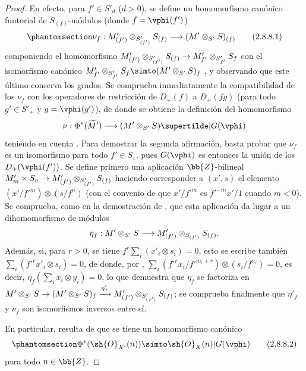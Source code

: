 \documentclass[oneside,10pt]{amsart}
\makeatletter
\newcommand{\ega@arrow}[2]{\mathchoice{#1}{#2}{#2}{#2}}
\renewcommand{\to}{\ega@arrow{\longrightarrow}{\rightarrow}}
\newcommand{\oldpage}[2][]{\marginnote{\normalfont\footnotesize\textbf{#1}~|~#2}\ignorespaces}
\let\EGAOriginalLabel\label
\renewcommand{\label}[1]{\phantomsection\EGAOriginalLabel{#1}}
\makeatother
\begin{document}
\begin{proof}
En efecto, para $f'\in S'_d$ ($d>0$), se define un homomorfismo canónico funtorial de $S_{(f)}$-módulos (donde $f=\vphi(f')$)
\[
\label{II.2.8.8.1}
  \nu_f: M'_{(f')}\otimes_{S'_{(f')}}S_{(f)} \to (M'\otimes_{S'}S)_{(f)}
\tag{2.8.8.1}
\]
componiendo el homomorfismo $M'_{(f')}\otimes_{S'_{(f')}}S_{(f)}\to M'_{f'}\otimes_{S'_{f'}}S_f$ con el isomorfismo canónico $M'_{f'}\otimes_{S'_{f'}}S_f\simto(M'\otimes_{S'}S)_f$ , y observando que este último conserva los grados.
Se comprueba inmediatamente la compatibilidad de los $\nu_f$ con los operadores de restricción de $D_+(f)$ a $D_+(fg)$ (para todo $g'\in S'_+$ y $g=\vphi(g')$), de donde se obtiene la definición del homomorfismo
\[
  \nu: \Phi^*(\widetilde M') \to (M'\otimes_{S'}S)\supertilde|G(\vphi)
\]
teniendo en cuenta .
Para demostrar la segunda afirmación, basta probar que $\nu_f$ es un isomorfismo para todo $f'\in S_1$, pues $G(\vphi)$ es entonces la unión de los $D_+(\vphi(f'))$.
Se define primero una aplicación $\bb{Z}$-bilineal $M'_m\times S_n\to M'_{(f')}\otimes_{S'_{(f')}}S_{(f)}$ haciendo corresponder a $(x',s)$ el elemento $(x'/{f'}^m)\otimes(s/f^n)$ (con el convenio de que $x'/{f'}^m$ es ${f'}^{-m}x'/1$ cuando $m<0$).
\oldpage[II]{45}
Se comprueba, como en la demostración de , que esta aplicación da lugar a un dihomomorfismo de módulos
\[
  \eta_f: M'\otimes_{S'}S \to M'_{(f')}\otimes_{S_{(f')}}S_{(f)}.
\]
Además, si, para $r>0$, se tiene $f^r\sum_i(x'_i\otimes s_i)=0$, esto se escribe también $\sum_i({f'}^rx'_i\otimes s_i)=0$, de donde, por , $\sum_i({f'}^rx_i/{f'}^{m_i+r})\otimes(s_i/f^{n_i})=0$, es decir, $\eta_f(\sum_i x_i\otimes y_i)=0$, lo que demuestra que $\eta_f$ se factoriza en $M'\otimes_{S'}S\to(M'\otimes_{S'}S)_f\xrightarrow{\eta'_f}M'_{(f')}\otimes_{S'_{(f')}}S_{(f)}$; se comprueba finalmente que $\eta'_f$ y $\nu_f$ son isomorfismos inversos entre sí.

En particular, resulta de  que se tiene un homomorfismo canónico
\[
\label{II.2.8.8.2}
  \Phi^*(\sh{O}_{X'}(n)) \simto \sh{O}_X(n)|G(\vphi)
\tag{2.8.8.2}
\]
para todo $n\in\bb{Z}$.
\end{proof}
\end{document}
